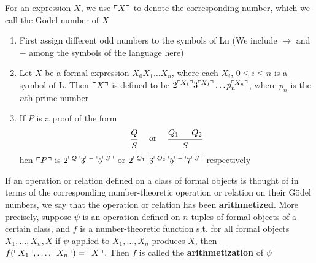 \documentclass[11pt]{article}
\begin{document}
\begin{definition}
For an expression \(X\), we use \(\ulcorner X \urcorner\) to denote the corresponding number, which we call
the Gödel number of \(X\)
\begin{enumerate}
\item First assign different odd numbers to the symbols of Ln (We include \(\to\) and \(-\) among
the symbols of the language here)
\item Let \(X\) be a formal expression \(X_0X_1\dots X_n\), where each \(X_i\), \(0\le i\le n\) is a
symbol of L. Then \(\ulcorner X \urcorner\) is defined to
be \(2^{\ulcorner X_1 \urcorner}3^{\ulcorner X_1 \urcorner}\dots p_n^{\ulcorner X_n \urcorner}\), where \(p_n\) is
the \(n\)th prime number
\item If \(P\) is a proof of the form
\begin{equation*}
\begin{prooftree}%
\hypo{Q}
\infer1{S}
\end{prooftree} \quad\text{ or }\quad
\begin{prooftree}%
\hypo{Q_1}
\hypo{Q_2}
\infer2{S}
\end{prooftree}
\end{equation*}
hen \(\ulcorner P \urcorner\) is \(2^{\ulcorner Q \urcorner}3^{\ulcorner - \urcorner}5^{\ulcorner S \urcorner}\) or
\(2^{\ulcorner Q_1 \urcorner}3^{\ulcorner Q_2 \urcorner}5^{\ulcorner - \urcorner}7^{\ulcorner S \urcorner}\) respectively
\end{enumerate}


If an operation or relation defined on a class of formal objects is thought of in terms of the
corresponding number-theoretic operation or relation on their Gödel numbers, we say that the
operation or relation has been \textbf{arithmetized}. More precisely, suppose \(\psi\) is an operation defined
on \(n\)-tuples of formal objects of a certain class, and \(f\) is a number-theoretic function
s.t. for all formal objects \(X_1,\dots,X_n,X\) if \(\psi\) applied to \(X_1,\dots,X_n\) produces \(X\),
then \(f(\ulcorner X_1 \urcorner,\dots,\ulcorner X_n \urcorner)=\ulcorner X \urcorner\). Then \(f\) is called the
\textbf{arithmetization} of \(\psi\)
\end{definition}
\end{document}

